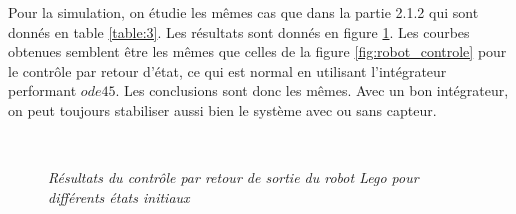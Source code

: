 \documentclass[11pt,french]{article} %
\begin{document}
\quad Pour la simulation, on étudie les mêmes cas que dans la partie 2.1.2 qui sont donnés en table \ref{table:3}. Les résultats sont donnés en figure \ref{fig:robot_capteur}. Les courbes obtenues semblent être les mêmes que celles de la figure \ref{fig:robot_controle} pour le contrôle par retour d'état, ce qui est normal en utilisant l'intégrateur performant $ode45$. Les conclusions sont donc les mêmes. Avec un bon intégrateur, on peut toujours stabiliser aussi bien le système avec ou sans capteur. \\

\begin{figure}[H]%
	\centering
	\noindent{} \\
		\captionsetup{justification=centering}
		\caption{\textit{Résultats du contrôle par retour de sortie du robot Lego pour différents états initiaux}}
		\label{fig:robot_capteur}%
\end{figure}
\vspace{0.5cm}
\end{document}
